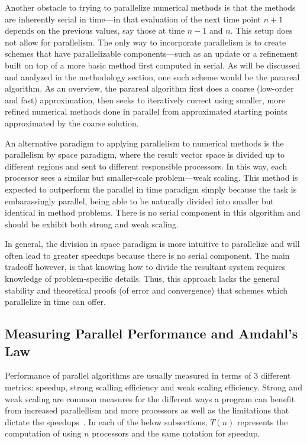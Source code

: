 \documentclass[letterpaper,12pt]{article}
\begin{document}
Another obstacle to trying to parallelize numerical methods is that the methods
are inherently serial in time---in that evaluation of the next time point $n+1$
depends on the previous values, say those at time $n-1$ and $n$. This setup
does not allow for parallelism. The only way to incorporate parallelism is to
create schemes that have parallelizable components---such as an update or a
refinement built on top of a more basic method first computed in serial. As will be discussed and analyzed in the
methodology section, one such scheme would be the parareal algorithm. As an
overview, the parareal algorithm first does a coarse (low-order and fast)
approximation, then seeks to iteratively correct using smaller, more refined
numerical methods done in parallel from approximated starting points
approximated by the coarse solution.

An alternative paradigm to applying parallelism to numerical methods is the
parallelism by space paradigm, where the result vector space is divided up to
different regions and sent to different responsible processors. In this way,
each processor sees a similar but smaller-scale problem---weak scaling. This
method is expected to outperform the parallel in time paradigm simply because
the task is embarassingly parallel, being able to be naturally divided
into smaller but identical in method problems. There is no serial component in
this algorithm and should be exhibit both strong and weak scaling.

In general, the division in space paradigm is more intuitive to parallelize and
will often lead to greater speedups because there is no serial component. The main tradeoff however, is that knowing how to divide the resultant system requires knowledge of problem-specific details. Thus, this approach lacks the
general stability and theoretical proofs (of error and convergence) that schemes which parallelize in
time can offer.

\subsection{Measuring Parallel Performance and Amdahl's Law}

Performance of parallel algorithms are usually measured in terms of 3 different
metrics: speedup, strong scalling efficiency and weak scaling efficiency.
Strong and weak scaling are common measures for the different ways a program can
benefit from increased parallellism and more processors as well as the
limitations that dictate the speedups~\cite{parallelscaling}. In each of the below subsections, $T(n)$ represents the computation of using $n$ processors and the same notation for speedup.
\end{document}
